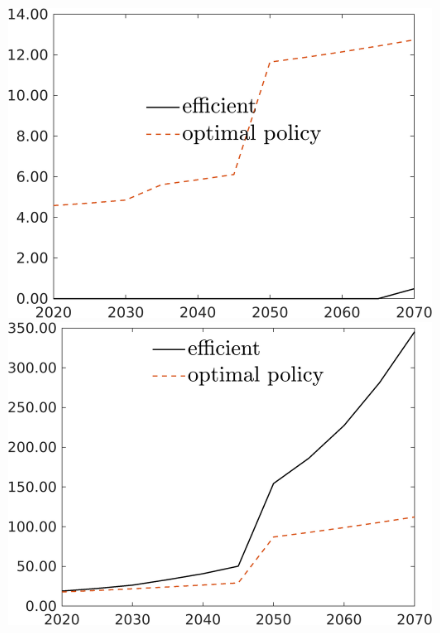 \begin{figure}[h!!]
\begin{minipage}[]{0.32\textwidth}
	\end{minipage}
	\begin{minipage}[]{0.32\textwidth}
		\includegraphics[width=1\textwidth]{../../codding_model/own_basedOnFried/optimalPol_190722_tidiedUp/figures/all_Aout22/sgsff_PercentageEffOptDyn_Target_regime3_spillover0_noskill0_sep1_xgrowth0_etaa0.79_lgd1.png}
	\end{minipage}
	\begin{minipage}[]{0.32\textwidth}
		\includegraphics[width=1\textwidth]{../../codding_model/own_basedOnFried/optimalPol_190722_tidiedUp/figures/all_Aout22/LgLf_PercentageBAUDyn_Target_regime3_spillover0_noskill0_sep1_xgrowth0_etaa0.79_lgd1.png}

\end{minipage}
\end{figure}
